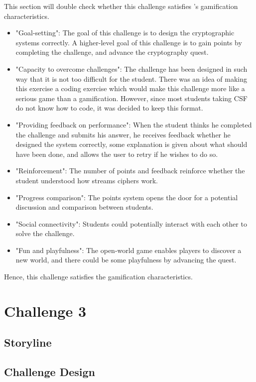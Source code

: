 \documentclass{l4proj}
\begin{document}
This section will double check whether this challenge satisfies \citet{cugelman_gamification:_2013}'s
gamification characteristics.
\begin{itemize}
    \item "Goal-setting": The goal of this challenge is to design the cryptographic systems correctly. 
    A higher-level goal of this challenge is to gain points by completing the challenge, 
    and advance the cryptography quest.
    \item "Capacity to overcome challenges": The challenge has been designed in such way 
    that it is not too difficult for the student. There was an idea of making this exercise a coding exercise
    which would make this challenge more like a serious game than a gamification. 
    However, since most students taking CSF do not know how to code, it was decided to keep this format.
    \item "Providing feedback on performance": When the student thinks he completed the challenge and submits his answer,
    he receives feedback whether he designed the system correctly, some explanation is given about what should have been done,
    and allows the user to retry if he wishes to do so.
    \item "Reinforcement": The number of points and feedback reinforce whether the student understood how streams ciphers work.
    \item "Progress comparison": The points system opens the door for a potential discussion and comparison between students.
    \item "Social connectivity": Students could potentially interact with each other to solve the challenge.
    \item "Fun and playfulness": The open-world game enables players to discover a new world, 
    and there could be some playfulness by advancing the quest.
\end{itemize}
Hence, this challenge satisfies the gamification characteristics.

\section{Challenge 3}

\subsection{Storyline}

\subsection{Challenge Design}
\end{document}

